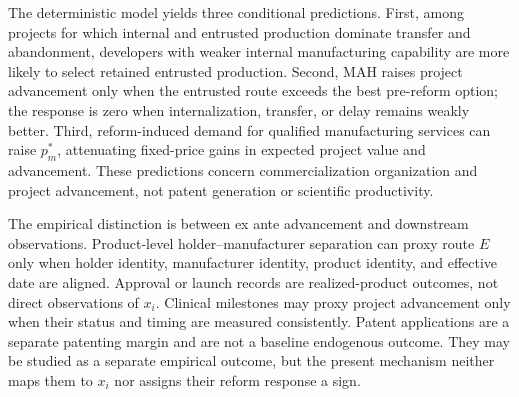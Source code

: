 \documentclass[12pt]{article}
\newcommand{\1}{\mathbf{1}}
\begin{document}
The deterministic model yields three conditional predictions. First, among
projects for which internal and entrusted production dominate transfer and
abandonment, developers with weaker internal manufacturing capability are
more likely to select retained entrusted production. Second, MAH raises
project advancement only when the entrusted route exceeds the best pre-reform
option; the response is zero when internalization, transfer, or delay remains
weakly better. Third, reform-induced demand for qualified manufacturing
services can raise \(p_m^*\), attenuating fixed-price gains in expected
project value and advancement. These predictions concern commercialization
organization and project advancement, not patent generation or scientific
productivity.

The empirical distinction is between ex ante advancement and downstream
observations. Product-level holder--manufacturer separation can proxy route
\(E\) only when holder identity, manufacturer identity, product identity, and
effective date are aligned. Approval or launch records are realized-product
outcomes, not direct observations of \(x_i\). Clinical milestones may proxy
project advancement only when their status and timing are measured consistently.
Patent applications are a separate patenting margin and are not a baseline
endogenous outcome. They may be studied as a separate empirical outcome, but
the present mechanism neither maps them to \(x_i\) nor assigns their reform
response a sign.
\end{document}
